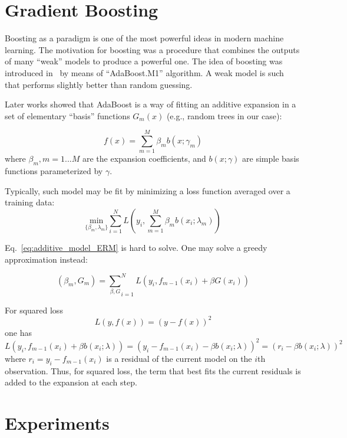 \documentclass[twoside]{article}
\begin{document}
\section{Gradient Boosting}

Boosting as a paradigm is one of the most powerful ideas in modern
machine learning.  The motivation for boosting was a procedure that
combines the outputs of many ``weak'' models to produce a powerful
one.  The idea of boosting was introduced in~\cite{} by means of
``AdaBoost.M1'' algorithm.  A weak model is such that performs
slightly better than random guessing.

Later works showed that AdaBoost is a way of fitting an additive
expansion in a set of elementary ``basis'' functions $G_m(x)$ (e.g.,
random trees in our case):

\begin{equation}
  f(x) = \sum_{m=1}^M\beta_m b(x;\gamma_m)
\end{equation}
where $\beta_m, m=1...M$ are the expansion coefficients, and
$b(x;\gamma)$ are simple basis functions parameterized by $\gamma$.

Typically, such model may be fit by minimizing a loss function
averaged over a training data:
\begin{equation}\label{eq:additive_model_ERM}
  \underset{\{\beta_m,\lambda_m\}}{\text{min}} \sum_{i=1}^{N}L(y_i,\sum_{m=1}^M \beta_m b(x_i;\lambda_m))
\end{equation}

Eq.~\ref{eq:additive_model_ERM} is hard to solve.  One may solve a greedy approximation instead:

\begin{equation}
  (\beta_m,G_m) = \underset{\beta,G} \sum_{i=1}^N L(y_i, f_{m-1}(x_i) + \beta G(x_i))
\end{equation}

For squared loss
\begin{equation}
  L(y, f(x)) = (y-f(x))^2
\end{equation}
one has
\begin{equation}
  L (y_i, f_{m-1}(x_i)+\beta b(x_i;\lambda)) = (y_i - f_{m-1}(x_i)-\beta b(x_i;\lambda))^2 =  (r_i - \beta b(x_i;\lambda))^2
\end{equation}
where $r_i=y_i-f_{m-1}(x_i)$ is a residual of the current model on the
$i$th observation.  Thus, for squared loss, the term that best fits
the current residuals is added to the expansion at each step.

\section{Experiments}
\end{document}
